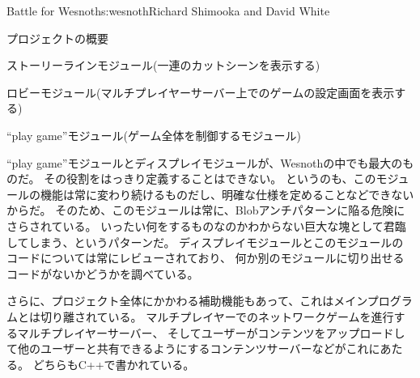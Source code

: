 \begin{aosachapter}{Battle for Wesnoth}{s:wesnoth}{Richard Shimooka and David White}
\begin{aosasect1}{プロジェクトの概要}
\begin{aosaitemize}
  \item ストーリーラインモジュール(一連のカットシーンを表示する)

  \item ロビーモジュール(マルチプレイヤーサーバー上でのゲームの設定画面を表示する)

  \item ``play game''モジュール(ゲーム全体を制御するモジュール)

\end{aosaitemize}

``play game''モジュールとディスプレイモジュールが、Wesnothの中でも最大のものだ。
その役割をはっきり定義することはできない。
というのも、このモジュールの機能は常に変わり続けるものだし、明確な仕様を定めることなどできないからだ。
そのため、このモジュールは常に、Blobアンチパターンに陥る危険にさらされている。
いったい何をするものなのかわからない巨大な塊として君臨してしまう、というパターンだ。
ディスプレイモジュールとこのモジュールのコードについては常にレビューされており、
何か別のモジュールに切り出せるコードがないかどうかを調べている。

さらに、プロジェクト全体にかかわる補助機能もあって、これはメインプログラムとは切り離されている。
マルチプレイヤーでのネットワークゲームを進行するマルチプレイヤーサーバー、
そしてユーザーがコンテンツをアップロードして他のユーザーと共有できるようにするコンテンツサーバーなどがこれにあたる。
どちらもC++で書かれている。


\end{aosasect1}
\end{aosachapter}
